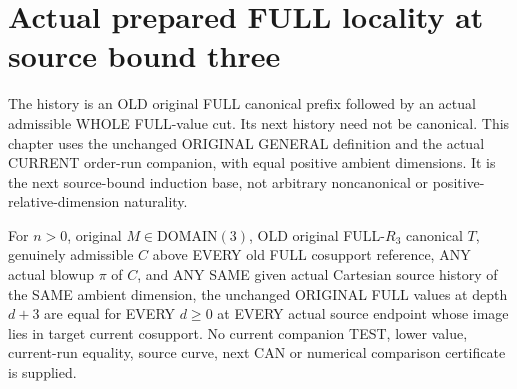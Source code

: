 \section{Actual prepared FULL locality at source bound three}

The history is an OLD original FULL canonical prefix followed by an
actual admissible WHOLE FULL-value cut. Its next history need not be
canonical. This chapter uses the unchanged ORIGINAL GENERAL definition
and the actual CURRENT order-run companion, with equal positive ambient
dimensions. It is the next source-bound induction base, not arbitrary
noncanonical or positive-relative-dimension naturality.

\begin{theorem}
\label{hir:original-prepared-bound-three-full-etale-values}
\leanok
For $n>0$, original $M\in\mathrm{DOMAIN}(3)$, OLD original FULL-$R_3$
canonical $T$, genuinely admissible $C$ above EVERY old FULL cosupport
reference, ANY actual blowup $\pi$ of $C$, and ANY SAME given actual
Cartesian source history of the SAME ambient dimension, the unchanged
ORIGINAL FULL values at depth $d+3$ are equal for EVERY $d\geq0$ at EVERY
actual source endpoint whose image lies in target current cosupport.
No current companion TEST, lower value, current-run equality, source
curve, next CAN or numerical comparison certificate is supplied.
\end{theorem}
